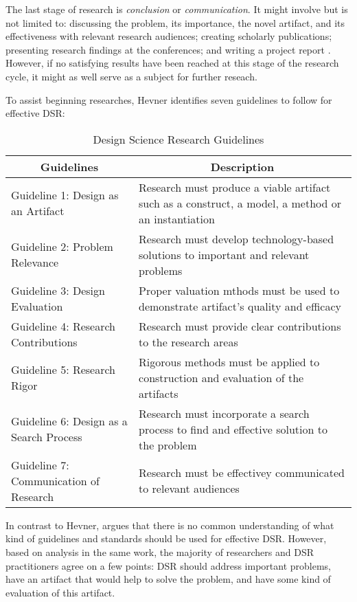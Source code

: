 The last stage of research is \textit{conclusion} or \textit{communication}. It
might involve but is not limited to: discussing the problem, its importance, the
novel artifact, and its effectiveness with relevant research audiences; creating
scholarly publications; presenting research findings at the conferences; and
writing a project report \citep{Archer1984}. However, if no satisfying results
have been reached at this stage of the research cycle, it might as well serve as
a subject for further reseach.

To assist beginning researches, Hevner \citeyearpar{Hevner2004} identifies seven
guidelines to follow for effective DSR:

\begin{table}[htb]
  \begin{center}
    \begin{tabular}{| l | p{6.5cm} |}
    \hline
     \multicolumn{1}{|c|}{\textbf{Guidelines}} &
     \multicolumn{1}{c|}{\textbf{Description}} \\
     \hline
     Guideline 1: Design as an Artifact & Research must produce a viable
    artifact such as a construct, a model, a method or an instantiation \\ \hline
     Guideline 2: Problem Relevance & Research must develop technology-based
     solutions to important and relevant problems \\ \hline 
     Guideline 3: Design Evaluation & Proper valuation mthods must be used to
     demonstrate artifact's quality and efficacy \\ \hline 
     Guideline 4: Research Contributions & Research must provide clear
     contributions to the research areas \\ \hline 
     Guideline 5: Research Rigor & Rigorous methods must be applied to
     construction and evaluation of the artifacts \\ \hline 
     Guideline 6: Design as a Search Process & Research must incorporate a
     search process to find and effective solution to the problem \\ \hline
     Guideline 7: Communication of Research & Research must be effectivey
     communicated to relevant audiences \\ \hline
    \end{tabular}
  \end{center}
  \caption{Design Science Research Guidelines \citep{Hevner2004}}
\end{table}

In contrast to Hevner, \citet{Venable2010} argues that there is no common
understanding of what kind of guidelines and standards should be used for
effective DSR. However, based on analysis in the same work, the majority of
researchers and DSR practitioners agree on a few points: DSR should address
important problems, have an artifact that would help to solve the problem, and
have some kind of evaluation of this artifact.

